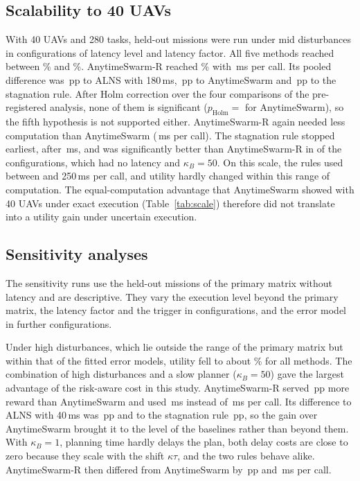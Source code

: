 \subsection{Scalability to 40 UAVs}\label{sec:res-xl}
With 40 UAVs and 280 tasks,  held-out missions were run under mid disturbances in 
configurations of latency level and latency factor. All five methods reached between \% and
\%. AnytimeSwarm-R reached \% with \,ms per call. Its pooled difference was
\,pp to ALNS with 180\,ms, \,pp to AnytimeSwarm and \,pp to the
stagnation rule. After Holm correction over the four comparisons of the pre-registered analysis, none of them is
significant ($p_{\mathrm{Holm}}=$  for AnytimeSwarm), so the fifth hypothesis is not supported either.
AnytimeSwarm-R again needed less computation than AnytimeSwarm (\,ms per call). The stagnation rule
stopped earliest, after \,ms, and was significantly better than AnytimeSwarm-R in  of the
 configurations, which had no latency and $\kappa_B=50$. On this scale, the rules used between  and 250\,ms
per call, and utility hardly changed within this range of computation. The equal-computation advantage that
AnytimeSwarm showed with 40 UAVs under exact execution (Table~\ref{tab:scale}) therefore did not translate into a
utility gain under uncertain execution.

\subsection{Sensitivity analyses}\label{sec:res-sens}
The sensitivity runs use the held-out missions of the primary matrix without latency and are descriptive. They vary the
execution level beyond the primary matrix, the latency factor and the trigger in  configurations, and
the error model in  further configurations.

Under high disturbances, which lie outside the range of the primary matrix but within that of the fitted error models,
utility fell to about \% for all methods. The combination of high disturbances and a slow planner
($\kappa_B=50$) gave the largest advantage of the risk-aware cost in this study. AnytimeSwarm-R served
\,pp more reward than AnytimeSwarm and used \,ms instead of
\,ms per call. Its difference to ALNS with 40\,ms was \,pp and to
the stagnation rule \,pp, so the gain over AnytimeSwarm brought it to the level of the
baselines rather than beyond them. With $\kappa_B=1$, planning time hardly delays the plan, both delay costs are close to
zero because they scale with the shift $\kappa\tau$, and the two rules behave alike. AnytimeSwarm-R then differed from
AnytimeSwarm by \,pp and \,ms per call.

